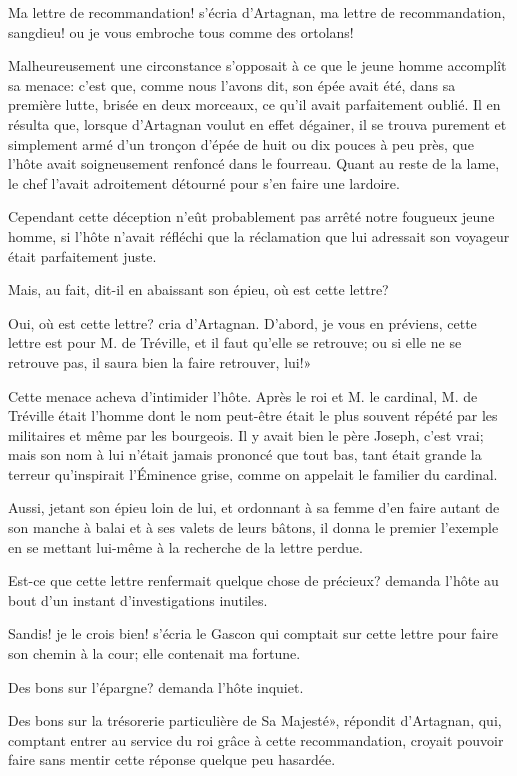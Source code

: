 \speak  Ma lettre de recommandation! s'écria d'Artagnan, ma lettre de recommandation, sangdieu! ou je vous embroche tous comme des ortolans! 

Malheureusement une circonstance s'opposait à ce que le jeune homme accomplît sa menace: c'est que, comme nous l'avons dit, son épée avait été, dans sa première lutte, brisée en deux morceaux, ce qu'il avait parfaitement oublié. Il en résulta que, lorsque d'Artagnan voulut en effet dégainer, il se trouva purement et simplement armé d'un tronçon d'épée de huit ou dix pouces à peu près, que l'hôte avait soigneusement renfoncé dans le fourreau. Quant au reste de la lame, le chef l'avait adroitement détourné pour s'en faire une lardoire. 

Cependant cette déception n'eût probablement pas arrêté notre fougueux jeune homme, si l'hôte n'avait réfléchi que la réclamation que lui adressait son voyageur était parfaitement juste. 

\speak  Mais, au fait, dit-il en abaissant son épieu, où est cette lettre? 

\speak  Oui, où est cette lettre? cria d'Artagnan. D'abord, je vous en préviens, cette lettre est pour M. de Tréville, et il faut qu'elle se retrouve; ou si elle ne se retrouve pas, il saura bien la faire retrouver, lui!» 

Cette menace acheva d'intimider l'hôte. Après le roi et M. le cardinal, M. de Tréville était l'homme dont le nom peut-être était le plus souvent répété par les militaires et même par les bourgeois. Il y avait bien le père Joseph, c'est vrai; mais son nom à lui n'était jamais prononcé que tout bas, tant était grande la terreur qu'inspirait l'Éminence grise, comme on appelait le familier du cardinal. 

Aussi, jetant son épieu loin de lui, et ordonnant à sa femme d'en faire autant de son manche à balai et à ses valets de leurs bâtons, il donna le premier l'exemple en se mettant lui-même à la recherche de la lettre perdue. 

\speak  Est-ce que cette lettre renfermait quelque chose de précieux? demanda l'hôte au bout d'un instant d'investigations inutiles. 

\speak  Sandis! je le crois bien! s'écria le Gascon qui comptait sur cette lettre pour faire son chemin à la cour; elle contenait ma fortune. 

\speak  Des bons sur l'épargne? demanda l'hôte inquiet. 

\speak  Des bons sur la trésorerie particulière de Sa Majesté», répondit d'Artagnan, qui, comptant entrer au service du roi grâce à cette recommandation, croyait pouvoir faire sans mentir cette réponse quelque peu hasardée. 

